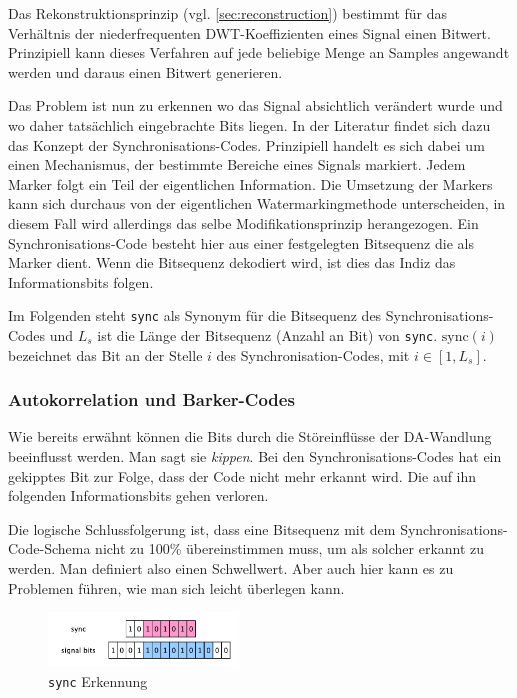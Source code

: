 Das Rekonstruktionsprinzip (vgl. \ref{sec:reconstruction}) bestimmt für das Verhältnis der niederfrequenten DWT-Koeffizienten eines Signal einen Bitwert. Prinzipiell kann dieses Verfahren auf jede beliebige Menge an Samples angewandt werden und daraus einen Bitwert generieren. 

Das Problem ist nun zu erkennen wo das Signal absichtlich verändert wurde und wo daher tatsächlich eingebrachte Bits liegen. In der Literatur findet sich dazu das Konzept der Synchron\-isations-Codes\cite{xiang2007robust}\cite{chang2012location}\cite{li2000transparent}\cite{ansari2004data}\cite{huang2002blind}\cite{petrovic1999data}\cite{wu2005efficiently}. Prinzipiell handelt es sich dabei um einen Mechanismus, der bestimmte Bereiche eines Signals markiert. Jedem Marker folgt ein Teil der eigentlichen Information. Die Umsetzung der Markers kann sich durchaus von der eigentlichen Watermarkingmethode unterscheiden, in diesem Fall wird allerdings das selbe Modifikationsprinzip herangezogen. 
Ein Synchronisations-Code besteht hier aus einer festgelegten Bitsequenz die als Marker dient. Wenn die Bitsequenz dekodiert wird, ist dies das Indiz das Informationsbits folgen. 

Im Folgenden steht \texttt{sync} als Synonym für die Bitsequenz des Synchronisations-Codes und ${L}_{s}$ ist die L\"ange der Bitsequenz (Anzahl an Bit) von \texttt{sync}. $\mbox{sync}(i)$ bezeichnet das Bit an der Stelle $i$ des Synchronisation-Codes, mit $i\in[1,{L}_{s}]$.

\subsubsection{Autokorrelation und Barker-Codes}
\label{sec:barker-code}


Wie bereits erwähnt können die Bits durch die Störeinflüsse der DA-Wandlung beeinflusst werden. Man sagt sie \textit{kippen}. Bei den Synchronisations-Codes hat ein gekipptes Bit zur Folge, dass der Code nicht mehr erkannt wird. Die auf ihn folgenden Informationsbits gehen verloren. 

Die logische Schlussfolgerung ist, dass eine Bitsequenz mit dem Synchronisations-Code-Schema nicht zu 100\% übereinstimmen muss, um als solcher erkannt zu werden. Man definiert also einen Schwellwert. Aber auch hier kann es zu Problemen führen, wie man sich leicht überlegen kann. 

\begin{figure}
	\includegraphics[width=0.45\textwidth]{figures/figure-sync-code-detection.pdf}
	\caption{\texttt{sync} Erkennung}
	\label{fig:sync-code-detection}
\end{figure}

